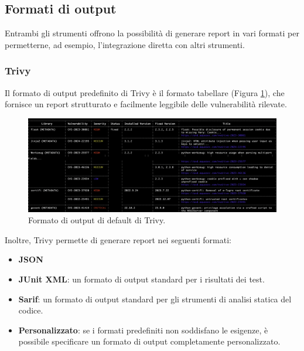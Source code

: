 \subsection{Formati di output}
Entrambi gli strumenti offrono la possibilità di generare report in vari formati per permetterne, ad esempio, l'integrazione diretta con altri strumenti.
\subsubsection{Trivy}
Il formato di output predefinito di Trivy è il formato tabellare (Figura \ref{fig:trivy_output_fmt}), che fornisce un report strutturato e facilmente leggibile delle vulnerabilità rilevate.
\begin{figure}[H]
   \centering
   \includegraphics[width=1\textwidth]{immagini/capitolo2/trivy_output_fmt.png}
   \caption{Formato di output di default di Trivy.}
   \label{fig:trivy_output_fmt}
\end{figure}
Inoltre, Trivy permette di generare report nei seguenti formati:
\begin{itemize}
   \item \textbf{JSON}
   \item \textbf{JUnit XML}: un formato di output standard per i risultati dei test.
   \item \textbf{Sarif}: un formato di output standard per gli strumenti di analisi statica del codice.
   \item \textbf{Personalizzato}: se i formati predefiniti non soddisfano le esigenze, è possibile specificare un formato di output completamente personalizzato.
\end{itemize}

